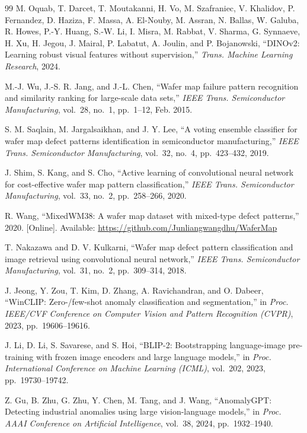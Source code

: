 \documentclass[conference]{IEEEtran}
\begin{document}
\begin{thebibliography}{99}
M. Oquab, T. Darcet, T. Moutakanni, H. Vo, M. Szafraniec, V. Khalidov, P. Fernandez, D. Haziza, F. Massa, A. El-Nouby, M. Assran, N. Ballas, W. Galuba, R. Howes, P.-Y. Huang, S.-W. Li, I. Misra, M. Rabbat, V. Sharma, G. Synnaeve, H. Xu, H. Jegou, J. Mairal, P. Labatut, A. Joulin, and P. Bojanowski, ``DINOv2: Learning robust visual features without supervision,'' \textit{Trans. Machine Learning Research}, 2024.

M.-J. Wu, J.-S. R. Jang, and J.-L. Chen, ``Wafer map failure pattern recognition and similarity ranking for large-scale data sets,'' \textit{IEEE Trans. Semiconductor Manufacturing}, vol.~28, no.~1, pp.~1--12, Feb. 2015.

S. M. Saqlain, M. Jargalsaikhan, and J. Y. Lee, ``A voting ensemble classifier for wafer map defect patterns identification in semiconductor manufacturing,'' \textit{IEEE Trans. Semiconductor Manufacturing}, vol.~32, no.~4, pp.~423--432, 2019.

J. Shim, S. Kang, and S. Cho, ``Active learning of convolutional neural network for cost-effective wafer map pattern classification,'' \textit{IEEE Trans. Semiconductor Manufacturing}, vol.~33, no.~2, pp.~258--266, 2020.

R. Wang, ``MixedWM38: A wafer map dataset with mixed-type defect patterns,'' 2020. [Online]. Available: \url{https://github.com/Junliangwangdhu/WaferMap}

T. Nakazawa and D. V. Kulkarni, ``Wafer map defect pattern classification and image retrieval using convolutional neural network,'' \textit{IEEE Trans. Semiconductor Manufacturing}, vol.~31, no.~2, pp.~309--314, 2018.

J. Jeong, Y. Zou, T. Kim, D. Zhang, A. Ravichandran, and O. Dabeer, ``WinCLIP: Zero-/few-shot anomaly classification and segmentation,'' in \textit{Proc. IEEE/CVF Conference on Computer Vision and Pattern Recognition (CVPR)}, 2023, pp.~19606--19616.

J. Li, D. Li, S. Savarese, and S. Hoi, ``BLIP-2: Bootstrapping language-image pre-training with frozen image encoders and large language models,'' in \textit{Proc. International Conference on Machine Learning (ICML)}, vol.~202, 2023, pp.~19730--19742.

Z. Gu, B. Zhu, G. Zhu, Y. Chen, M. Tang, and J. Wang, ``AnomalyGPT: Detecting industrial anomalies using large vision-language models,'' in \textit{Proc. AAAI Conference on Artificial Intelligence}, vol.~38, 2024, pp.~1932--1940.


\end{thebibliography}
\end{document}
